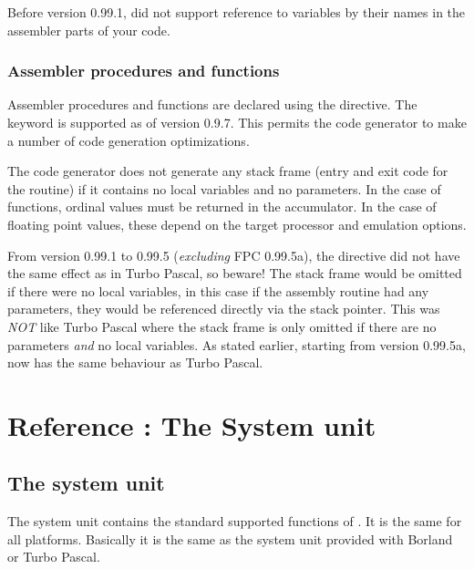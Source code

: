 \documentclass{report}
\begin{document}
\begin{remark}
Before version 0.99.1, \fpc did not support reference to variables by 
their names in the assembler parts of your code.
\end{remark}

\section{Assembler procedures and functions}
Assembler procedures and functions are declared using the
 directive. The  keyword is supported
as of version 0.9.7. This permits the code generator to make a number
of code generation optimizations.

The code generator does not generate any stack frame (entry and exit
code for the routine) if it contains no local variables and no
parameters. In the case of functions, ordinal values must be returned
in the accumulator. In the case of floating point values, these depend
on the target processor and emulation options.

\begin{remark} From version 0.99.1 to 0.99.5 (\emph{excluding}
FPC 0.99.5a), the  directive did not have the
same effect as in Turbo Pascal, so beware! The stack frame would be
omitted if there were no local variables, in this case if the assembly
routine had any parameters, they would be referenced directly via the stack
pointer. This was \emph{ NOT} like Turbo Pascal where the stack frame is only
omitted if there are no parameters \emph{ and } no local variables. As
stated earlier, starting from version 0.99.5a, \fpc now has the same
behaviour as Turbo Pascal.
\end{remark}

%
%

\part{Reference : The System unit}

\chapter{The system unit}
\label{ch:refchapter}
The system unit contains the standard supported functions of \fpc. It is the
same for all platforms. Basically it is the same as the system unit provided
with Borland or Turbo Pascal.
\end{document}
